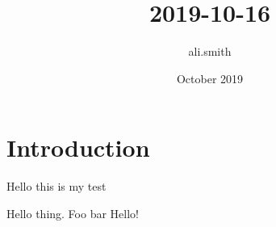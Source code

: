 \documentclass{article}
\title{2019-10-16}
\author{ali.smith }
\date{October 2019}
\begin{document}
\maketitle

\section{Introduction}
Hello this is my test

Hello thing. Foo bar Hello!
\end{document}
